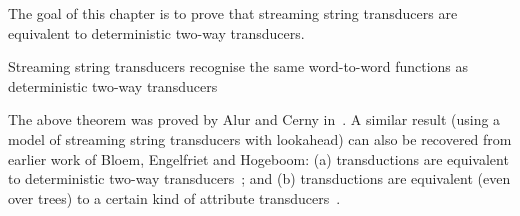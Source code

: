 The goal of this chapter is to prove that streaming string transducers are equivalent to deterministic two-way transducers.

\begin{theorem}\label{thm:sst-two-way}
	Streaming string transducers recognise the same word-to-word functions  as deterministic two-way transducers
\end{theorem}
The above theorem was proved by Alur and Cerny in~\cite{Alur:2010gc}. A similar result (using a model of streaming string transducers  with lookahead)  can also be recovered from earlier work of  Bloem, Engelfriet and Hogeboom: (a)  \mso transductions are equivalent to deterministic two-way transducers~\cite{Engelfriet:2001kv};  and (b) \mso transductions are equivalent (even over trees) to a   certain kind of  attribute transducers~\cite{Bloem:2000wq}.

